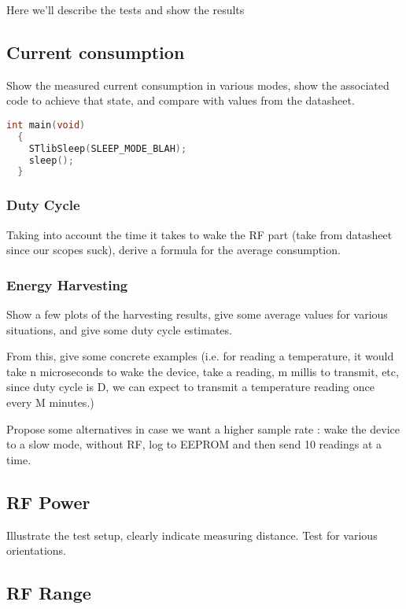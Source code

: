 Here we'll describe the tests and show the results

\subsection{Current consumption}

Show the measured current consumption in various modes, show the associated code
to achieve that state, and compare with values from the datasheet.

\begin{lstlisting}[language=C,caption=Example code for sleep mode A]
  int main(void)
  {
    STlibSleep(SLEEP_MODE_BLAH);
    sleep();
  }
\end{lstlisting}

\subsubsection{Duty Cycle}

Taking into account the time it takes to wake the RF part (take from datasheet
since our scopes suck), derive a formula for the average consumption.

\subsubsection{Energy Harvesting}

Show a few plots of the harvesting results, give some average values for various
situations, and give some duty cycle estimates.

From this, give some concrete examples (i.e. for reading a temperature, it would
take n microseconds to wake the device, take a reading, m millis to transmit,
etc, since duty cycle is D, we can expect to transmit a temperature reading once
every M minutes.)

Propose some alternatives in case we want a higher sample rate : wake the device
to a slow mode, without RF, log to EEPROM and then send 10 readings at a time.

\subsection{RF Power}

Illustrate the test setup, clearly indicate measuring distance. Test for various
orientations.

\subsection{RF Range}


